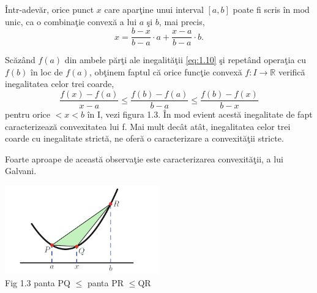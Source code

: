 \documentclass[a4paper,12pt,oneside]{report}
\begin{document}
\^{I}ntr-adev\u{a}r,  orice punct \(x\) care apar\c{t}ine unui interval \(\left [ a,b \right ]\) poate fi scris \^{i}n mod unic, ca o combina\c{t}ie convex\u{a} a lui \(a\) \c{s}i \(b\), mai precis,
\begin{displaymath}
    x = \frac{b - x}{b - a} \cdot a  + \frac{x- a}{b - a}\cdot b.
\end{displaymath}

Sc\u{a}z\^{a}nd \(f\left ( a \right )\) din ambele p\u{a}r\c{t}i ale inegalit\u{a}\c{t}ii \ref{eq:1.10} \c{s}i repet\^{a}nd opera\c{t}ia cu \(f\left ( b \right )\) \^{i}n loc de \(f\left ( a \right )\), ob\c{t}inem faptul c\u{a} orice func\c{t}ie convex\u{a} \(f : I \rightarrow \mathbb{R}\) verific\u{a} inegalitatea celor trei coarde,
\begin{displaymath}
   \frac{f\left ( x \right ) - f\left ( a \right )}{x-a}\leq \frac{f\left ( b \right )- f\left ( a \right )}{b-a}\leq \frac{f\left ( b \right ) - f\left ( x \right )}{b-x} \label{eq:1.12} \tag{1.12}
\end{displaymath}
pentru orice \(< x< b\) \^{i}n I, vezi figura 1.3. \^{I}n mod evient acest\u{a} inegalitate de fapt caracterizeaz\u{a} convexitatea lui f. Mai mult dec\^{a}t at\^{a}t, inegalitatea celor trei coarde cu inegalitate strict\u{a}, ne ofer\u{a} o caracterizare a convexit\u{a}\c{t}ii stricte. 

Foarte aproape de aceast\u{a} observa\c{t}ie este caracterizarea convexit\u{a}\c{t}ii, a lui Galvani.

\begin{center}
    \includegraphics[width=0.5\textwidth]{fig1.3.png}
    \\ Fig 1.3 panta PQ \(\leq\) panta PR \(\leq \)QR
\end{center}
\end{document}
